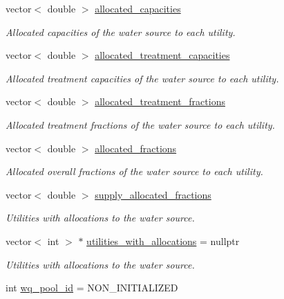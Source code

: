 \begin{DoxyCompactItemize}
vector$<$ double $>$ \mbox{\hyperlink{classWaterSource_ab94063d51314cfb896010408ae32fa9c}{allocated\+\_\+capacities}}
\begin{DoxyCompactList}\small\item\em Allocated capacities of the water source to each utility. \end{DoxyCompactList}\item 
vector$<$ double $>$ \mbox{\hyperlink{classWaterSource_a87dc0bfb5cf4e2b9a953c7a80058c923}{allocated\+\_\+treatment\+\_\+capacities}}
\begin{DoxyCompactList}\small\item\em Allocated treatment capacities of the water source to each utility. \end{DoxyCompactList}\item 
vector$<$ double $>$ \mbox{\hyperlink{classWaterSource_aa73fe10cfc6579b2fb79529e1dde5140}{allocated\+\_\+treatment\+\_\+fractions}}
\begin{DoxyCompactList}\small\item\em Allocated treatment fractions of the water source to each utility. \end{DoxyCompactList}\item 
vector$<$ double $>$ \mbox{\hyperlink{classWaterSource_a2f6655a80c4847fe039987255d9d998c}{allocated\+\_\+fractions}}
\begin{DoxyCompactList}\small\item\em Allocated overall fractions of the water source to each utility. \end{DoxyCompactList}\item 
vector$<$ double $>$ \mbox{\hyperlink{classWaterSource_a87535be59994b2602576cdf34dbe04b9}{supply\+\_\+allocated\+\_\+fractions}}
\begin{DoxyCompactList}\small\item\em Utilities with allocations to the water source. \end{DoxyCompactList}\item 
vector$<$ int $>$ $\ast$ \mbox{\hyperlink{classWaterSource_ac345583fc2d0f7e1db31ee40244d7ace}{utilities\+\_\+with\+\_\+allocations}} = nullptr
\begin{DoxyCompactList}\small\item\em Utilities with allocations to the water source. \end{DoxyCompactList}\item 
int \mbox{\hyperlink{classWaterSource_acef73d9b1675fb6db9ec39347514db6d}{wq\+\_\+pool\+\_\+id}} = N\+O\+N\+\_\+\+I\+N\+I\+T\+I\+A\+L\+I\+Z\+ED

\end{DoxyCompactItemize}
